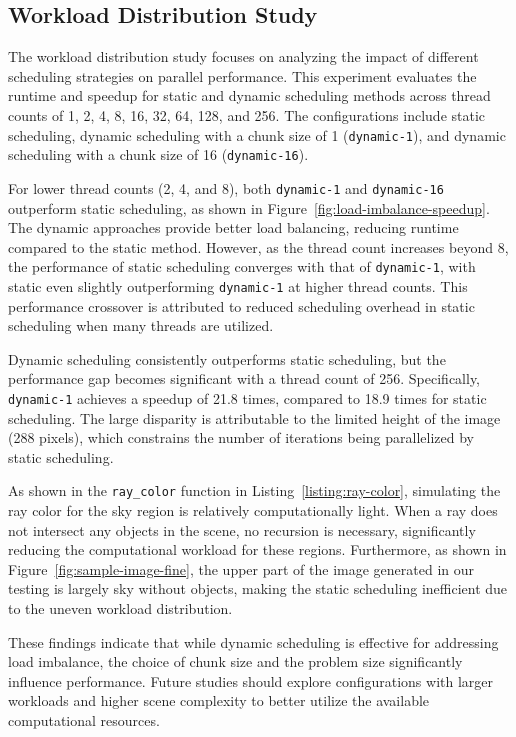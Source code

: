 \subsection{Workload Distribution Study}
\label{subsec:workload-distribution-study}

The workload distribution study focuses on analyzing the impact of different scheduling strategies on parallel performance. This experiment evaluates the runtime and speedup for static and dynamic scheduling methods across thread counts of 1, 2, 4, 8, 16, 32, 64, 128, and 256. The configurations include static scheduling, dynamic scheduling with a chunk size of 1 (\texttt{dynamic-1}), and dynamic scheduling with a chunk size of 16 (\texttt{dynamic-16}).

For lower thread counts (2, 4, and 8), both \texttt{dynamic-1} and \texttt{dynamic-16} outperform static scheduling, as shown in Figure~\ref{fig:load-imbalance-speedup}. The dynamic approaches provide better load balancing, reducing runtime compared to the static method. However, as the thread count increases beyond 8, the performance of static scheduling converges with that of \texttt{dynamic-1}, with static even slightly outperforming \texttt{dynamic-1} at higher thread counts. This performance crossover is attributed to reduced scheduling overhead in static scheduling when many threads are utilized.

Dynamic scheduling consistently outperforms static scheduling, but the performance gap becomes significant with a thread count of 256. Specifically, \texttt{dynamic-1} achieves a speedup of 21.8 times, compared to 18.9 times for static scheduling. The large disparity is attributable to the limited height of the image (288 pixels), which constrains the number of iterations being parallelized by static scheduling. 

As shown in the \texttt{ray\_color} function in Listing~\ref{listing:ray-color}, simulating the ray color for the sky region is relatively computationally light. When a ray does not intersect any objects in the scene, no recursion is necessary, significantly reducing the computational workload for these regions. Furthermore, as shown in Figure~\ref{fig:sample-image-fine}, the upper part of the image generated in our testing is largely sky without objects, making the static scheduling inefficient due to the uneven workload distribution.

These findings indicate that while dynamic scheduling is effective for addressing load imbalance, the choice of chunk size and the problem size significantly influence performance. Future studies should explore configurations with larger workloads and higher scene complexity to better utilize the available computational resources.

